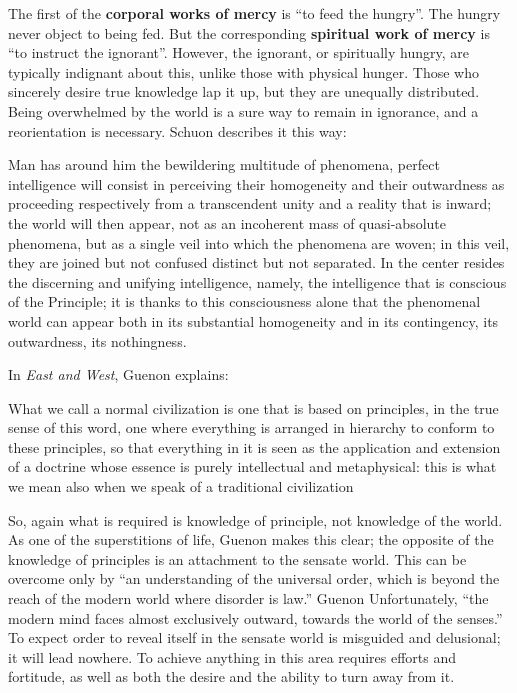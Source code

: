 The first of the \textbf{corporal works of mercy} is ``to feed the hungry''. The hungry never object to being fed. But the corresponding \textbf{spiritual work of mercy} is ``to instruct the ignorant''. However, the ignorant, or spiritually hungry, are typically indignant about this, unlike those with physical hunger. Those who sincerely desire true knowledge lap it up, but they are unequally distributed. Being overwhelmed by the world is a sure way to remain in ignorance, and a reorientation is necessary. Schuon describes it this way:

\begin{quotex}
Man has around him the bewildering multitude of phenomena, perfect intelligence will consist in perceiving their homogeneity and their outwardness as proceeding respectively from a transcendent unity and a reality that is inward; the world will then appear, not as an incoherent mass of quasi-absolute phenomena, but as a single veil into which the phenomena are woven; in this veil, they are joined but not confused distinct but not separated. In the center resides the discerning and unifying intelligence, namely, the intelligence that is conscious of the Principle; it is thanks to this consciousness alone that the phenomenal world can appear both in its substantial homogeneity and in its contingency, its outwardness, its nothingness.
\end{quotex}


In \textit{East and West}, Guenon explains:

\begin{quotex}
What we call a normal civilization is one that is based on principles, in the true sense of this word, one where everything is arranged in hierarchy to conform to these principles, so that everything in it is seen as the application and extension of a doctrine whose essence is purely intellectual and metaphysical: this is what we mean also when we speak of a traditional civilization
\end{quotex}


So, again what is required is knowledge of principle, not knowledge of the world. As one of the superstitions of life, Guenon makes this clear; the opposite of the knowledge of principles is an attachment to the sensate world. This can be overcome only by ``an understanding of the universal order, which is beyond the reach of the modern world where disorder is law.'' Guenon Unfortunately, ``the modern mind faces almost exclusively outward, towards the world of the senses.'' To expect order to reveal itself in the sensate world is misguided and delusional; it will lead nowhere. To achieve anything in this area requires efforts and fortitude, as well as both the desire and the ability to turn away from it.

